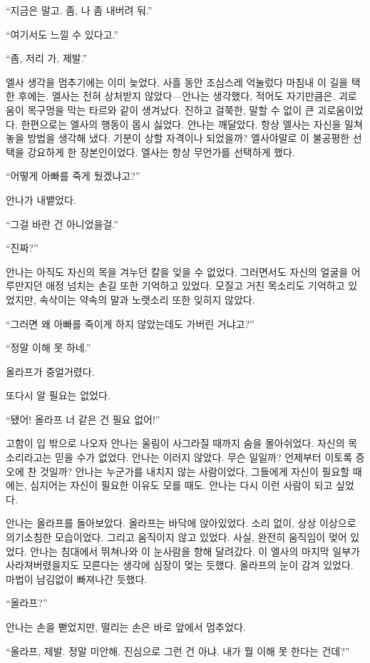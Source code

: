 ``지금은 말고. 좀, 나 좀 내버려 둬.''

``여기서도 느낄 수 있다고.''

``좀, 저리 가, 제발.''

엘사 생각을 멈추기에는 이미 늦었다, 사흘 동안 조심스레 억눌렀다 마침내 이 길을 택한 후에는. 엘사는 전혀 상처받지 않았다—안나는 생각했다, 적어도 자기만큼은. 괴로움이 목구멍을 막는 타르와 같이 생겨났다. 진하고 걸쭉한, 말할 수 없이 큰 괴로움이었다. 한편으로는 엘사의 행동이 몹시 싫었다. 안나는 깨달았다. 항상 엘사는 자신을 밀쳐 놓을 방법을 생각해 냈다. 기분이 상할 자격이나 되었을까? 엘사야말로 이 불공평한 선택을 강요하게 한 장본인이었다. 엘사는 항상 무언가를 선택하게 했다.

``어떻게 아빠를 죽게 뒀겠냐고?''

안나가 내뱉었다.

``그걸 바란 건 아니었을걸.''

``진짜?''

안나는 아직도 자신의 목을 겨누던 칼을 잊을 수 없었다. 그러면서도 자신의 얼굴을 어루만지던 애정 넘치는 손길 또한 기억하고 있었다. 모질고 거친 목소리도 기억하고 있었지만, 속삭이는 약속의 말과 노랫소리 또한 잊히지 않았다.

``그러면 왜 아빠를 죽이게 하지 않았는데도 가버린 거냐고?''

``정말 이해 못 하네.''

올라프가 중얼거렸다.

또다시 알 필요는 없었다.

``됐어! 올라프 너 같은 건 필요 없어!''

고함이 입 밖으로 나오자 안나는 울림이 사그라질 때까지 숨을 몰아쉬었다. 자신의 목소리라고는 믿을 수가 없었다. 안나는 이러지 않았다. 무슨 일일까? 언제부터 이토록 증오에 찬 것일까? 안나는 누군가를 내치지 않는 사람이었다, 그들에게 자신이 필요할 때에는, 심지어는 자신이 필요한 이유도 모를 때도. 안나는 다시 이런 사람이 되고 싶었다.

안나는 올라프를 돌아보았다. 올라프는 바닥에 앉아있었다. 소리 없이, 상상 이상으로 의기소침한 모습이었다. 그리고 움직이지 않고 있었다. 사실, 완전히 움직임이 멎어 있었다. 안나는 침대에서 뛰쳐나와 이 눈사람을 향해 달려갔다. 이 엘사의 마지막 일부가 사라져버렸을지도 모른다는 생각에 심장이 멎는 듯했다. 올라프의 눈이 감겨 있었다. 마법이 남김없이 빠져나간 듯했다.

``올라프?''

안나는 손을 뻗었지만, 떨리는 손은 바로 앞에서 멈추었다.

``올라프, 제발. 정말 미안해. 진심으로 그런 건 아냐. 내가 뭘 이해 못 한다는 건데?''

